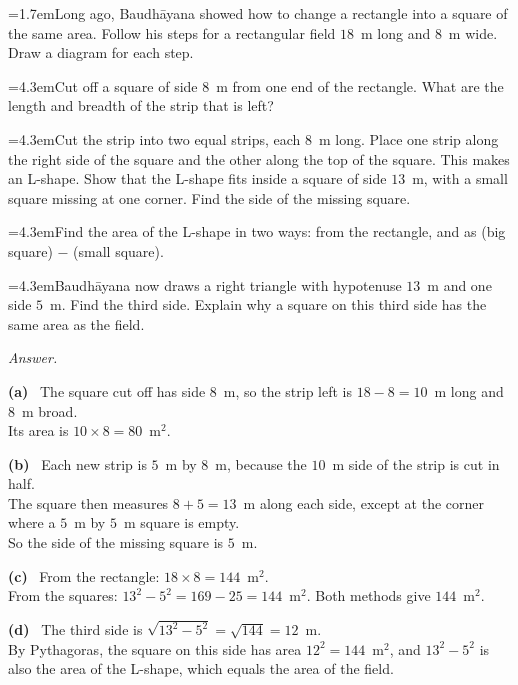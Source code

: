 \documentclass[11pt,a4paper]{article}
\newcommand{\nl}{\\[3pt]}
\newcounter{qn}
\newcommand{\ques}{\par\medskip\refstepcounter{qn}\noindent\hangindent=1.7em\hangafter=1\makebox[1.7em][l]{\textbf{\arabic{qn}.}}\ignorespaces}
\newcommand{\pc}[2]{\par\smallskip\noindent\hspace*{2em}\hangindent=4.3em\hangafter=1\makebox[2em][l]{(#1)}\hspace{0.3em}#2\par}
\newenvironment{answerblock}
  {\par\needspace{6\baselineskip}\smallskip\begingroup\small\linespread{1.2}\selectfont\color{muted}\noindent\textit{Answer.}\par}
  {\par\endgroup\medskip}
\newcommand{\ap}[1]{\par\smallskip\noindent\textbf{(#1)}\ }
\begin{document}
\ques Long ago, Baudh\={a}yana showed how to change a rectangle into a square of the same area. Follow his steps for a rectangular field $18$~m long and $8$~m wide. Draw a diagram for each step.\par
\pc{a}{Cut off a square of side $8$~m from one end of the rectangle. What are the length and breadth of the strip that is left?}
\pc{b}{Cut the strip into two equal strips, each $8$~m long. Place one strip along the right side of the square and the other along the top of the square. This makes an L-shape. Show that the L-shape fits inside a square of side $13$~m, with a small square missing at one corner. Find the side of the missing square.}
\pc{c}{Find the area of the L-shape in two ways: from the rectangle, and as (big square) $-$ (small square).}
\pc{d}{Baudh\={a}yana now draws a right triangle with hypotenuse $13$~m and one side $5$~m. Find the third side. Explain why a square on this third side has the same area as the field.}
\begin{answerblock}
\ap{a} The square cut off has side $8$~m, so the strip left is $18-8=10$~m long and $8$~m broad.\nl
Its area is $10\times8=80$~m$^2$.
\ap{b} Each new strip is $5$~m by $8$~m, because the $10$~m side of the strip is cut in half.\nl
The square then measures $8+5=13$~m along each side, except at the corner where a $5$~m by $5$~m square is empty.\nl
So the side of the missing square is $5$~m.
\ap{c} From the rectangle: $18\times8=144$~m$^2$.\nl
From the squares: $13^2-5^2=169-25=144$~m$^2$. Both methods give $144$~m$^2$.
\ap{d} The third side is $\sqrt{13^2-5^2}=\sqrt{144}=12$~m.\nl
By Pythagoras, the square on this side has area $12^2=144$~m$^2$, and $13^2-5^2$ is also the area of the L-shape, which equals the area of the field.
\begin{center}
\end{center}
\end{answerblock}
\end{document}
